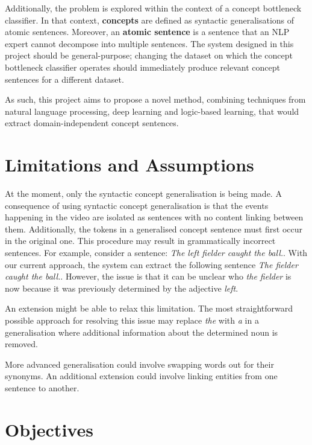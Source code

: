 Additionally, the problem is explored within the context of a concept bottleneck classifier. 
In that context, \textbf{concepts} are defined as syntactic generalisations of atomic sentences. 
Moreover, an \textbf{atomic sentence} is a sentence that an NLP expert cannot decompose into multiple sentences.
The system designed in this project should be general-purpose; changing the dataset on which the concept bottleneck classifier operates should immediately produce relevant concept sentences for a different dataset.

As such, this project aims to propose a novel method, combining techniques from natural language processing, deep learning and logic-based learning, that would extract domain-independent concept sentences.


\section{Limitations and Assumptions}

At the moment, only the syntactic concept generalisation is being made. 
A consequence of using syntactic concept generalisation is that the events happening in the video are isolated as sentences with no content linking between them. 
Additionally, the tokens in a generalised concept sentence must first occur in the original one.
This procedure may result in grammatically incorrect sentences.
For example, consider a sentence: \emph{The left fielder caught the ball.}.
With our current approach, the system can extract the following sentence \emph{The fielder caught the ball.}.
However, the issue is that it can be unclear who \emph{the fielder} is now because it was previously determined by the adjective \emph{left}.

An extension might be able to relax this limitation.
The most straightforward possible approach for resolving this issue may replace \emph{the} with \emph{a} in a generalisation where additional information about the determined noun is removed.

More advanced generalisation could involve swapping words out for their synonyms.
An additional extension could involve linking entities from one sentence to another. 



\section{Objectives}

